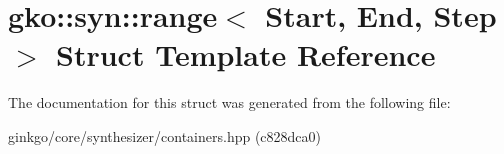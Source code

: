 \hypertarget{structgko_1_1syn_1_1range}{}\section{gko\+:\+:syn\+:\+:range$<$ Start, End, Step $>$ Struct Template Reference}
\label{structgko_1_1syn_1_1range}


The documentation for this struct was generated from the following file\+:\begin{DoxyCompactItemize}
\item 
ginkgo/core/synthesizer/containers.\+hpp (c828dca0)\end{DoxyCompactItemize}
